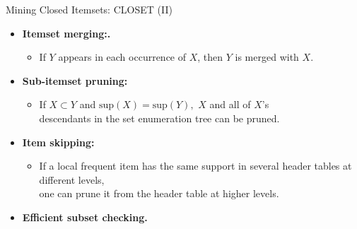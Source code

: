 \begin{frame}{Mining Closed Itemsets: CLOSET (II)}
	\begin{itemize}
		\item \textbf{Itemset merging:.}
		      \begin{itemize}
			      \item If $Y$ appears in each occurrence of $X$, then $Y$ is merged
			            with $X$.
		      \end{itemize}
		\item \textbf{Sub-itemset pruning:}
		      \begin{itemize}
			      \item If $X \subset Y$ and $\text{sup}(X) = \text{sup}(Y),$ $X$ and
			            all of $X$'s\\
			            descendants in the set enumeration tree can be pruned.
		      \end{itemize}
		\item \textbf{Item skipping:}
		      \begin{itemize}
			      \item If a local frequent item has the same support in several
			            header tables at different levels, \\
			            one can prune it from the header table at higher levels.
		      \end{itemize}
		\item \textbf{Efficient subset checking.}
	\end{itemize}
\end{frame}

